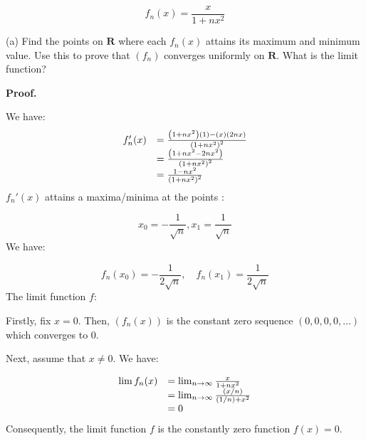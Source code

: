 \documentclass[10pt]{article}
\begin{document}
\begin{equation*}
f_{n}( x) =\frac{x}{1+nx^{2}}
\end{equation*}


(a) Find the points on $\displaystyle \mathbf{R}$ where each $\displaystyle f_{n}( x)$ attains its maximum and minimum value. Use this to prove that $\displaystyle ( f_{n})$ converges uniformly on $\displaystyle \mathbf{R}$. What is the limit function?



\textbf{Proof.}



We have: 
\begin{equation*}
\begin{array}{ c l }
f_{n} '( x) & =\frac{\left( 1+nx^{2}\right)( 1) -( x)( 2nx)}{\left( 1+nx^{2}\right)^{2}}\\
 & =\frac{\left( 1+nx^{2} -2nx^{2}\right)}{\left( 1+nx^{2}\right)^{2}}\\
 & =\frac{1-nx^{2}}{\left( 1+nx^{2}\right)^{2}}
\end{array}
\end{equation*}
$\displaystyle f_{n} '( x)$ attains a maxima/minima at the points :


\begin{equation*}
x_{0} =-\frac{1}{\sqrt{n}} ,x_{1} =\frac{1}{\sqrt{n}}
\end{equation*}
We have:


\begin{equation*}
f_{n}( x_{0}) =-\frac{1}{2\sqrt{n}} ,\quad f_{n}( x_{1}) =\frac{1}{2\sqrt{n}}
\end{equation*}
The limit function $\displaystyle f$:



Firstly, fix $\displaystyle x=0$. Then, $\displaystyle ( f_{n}( x))$ is the constant zero sequence $\displaystyle ( 0,0,0,0,\dotsc )$ which converges to 0.



Next, assume that $\displaystyle x\neq 0$. We have:


\begin{equation*}
\begin{array}{ c l }
\lim f_{n}( x) & =\lim _{n\rightarrow \infty }\frac{x}{1+nx^{2}}\\
 & =\lim _{n\rightarrow \infty }\frac{( x/n)}{( 1/n) +x^{2}}\\
 & =0
\end{array}
\end{equation*}
Consequently, the limit function $\displaystyle f$ is the constantly zero function $\displaystyle f( x) =0$. 
\end{document}
